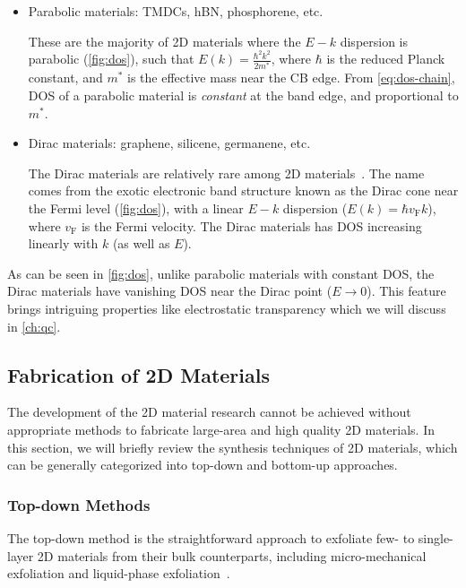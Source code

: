 \begin{itemize}
\item Parabolic materials: TMDCs, hBN, phosphorene, etc.

  These are the majority of 2D materials where the $E-k$ dispersion is
  parabolic (\autoref{fig:dos}), such that
  ${\displaystyle E(k) = \frac{\hbar^{2} k^{2}}{2 m^{*}}}$, where
  $\hbar$ is the reduced Planck constant, and $m^{*}$ is the effective
  mass near the CB edge. From \autoref{eq:dos-chain}, DOS of a
  parabolic material is \textit{constant} at the band edge, and
  proportional to $m^{*}$.
  
\item Dirac materials: graphene, silicene, germanene, etc.

  The Dirac materials are relatively rare among 2D
  materials~\autocite{Wang_2015_rare_dirac}.
  The name comes from the exotic electronic band structure known as the
  Dirac cone near the Fermi level (\autoref{fig:dos}), with a linear
  $E-k$ dispersion ($E(k) = \hbar v_{\mathrm{F}}k$), where
  $v_{\mathrm{F}}$ is the Fermi velocity. The Dirac materials has DOS
  increasing linearly with $k$ (as well as $E$).
\end{itemize}

As can be seen in \autoref{fig:dos}, unlike parabolic
materials with constant DOS, the Dirac materials have vanishing DOS near the
Dirac point ($E \to 0$). This feature brings intriguing 
properties like electrostatic transparency which we will discuss in
\autoref{ch:qc}.


\subsection{Fabrication of 2D Materials}
\label{sec:fabr-2d-mater}

The development of the 2D material research cannot be achieved
without appropriate methods to fabricate large-area and high quality
2D materials. In this section, we will briefly review the synthesis
techniques of 2D materials, which can be generally categorized into
top-down and bottom-up approaches. 

\subsubsection{Top-down Methods}
\label{sec:top-down-methods}

The top-down method is the straightforward approach to exfoliate few-
to single-layer 2D materials from their bulk counterparts, including micro-mechanical exfoliation and liquid-phase
exfoliation~\autocite{Novoselov_2012_roadmap,Liu_2018_rev,Lin_2019_gr_rev_growth}.

